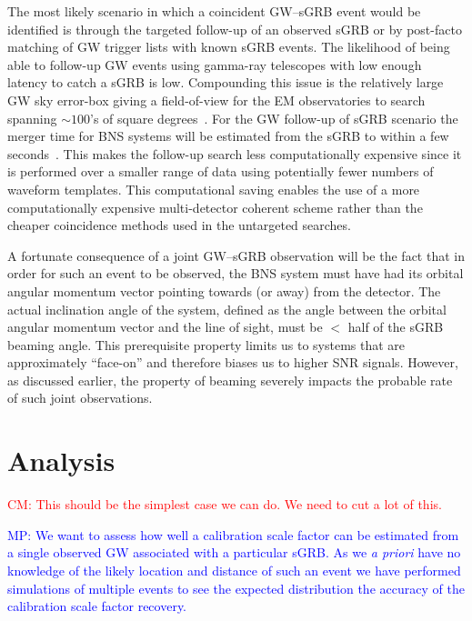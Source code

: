 \documentclass[10pt]{iopart}
\newcommand{\cm}[1]{\textcolor{red}{CM: #1}}
\newcommand{\MP}[1]{\textcolor{blue}{MP: #1}}
\begin{document}
The most likely scenario in which a coincident \ac{GW}--\ac{sGRB} event would
be identified is through the targeted follow-up of an observed \ac{sGRB} or by
post-facto matching of \ac{GW} trigger lists with known \ac{sGRB} events.  The
likelihood of being able to follow-up \ac{GW} events using gamma-ray telescopes
with low enough latency to catch a \ac{sGRB} is low.  Compounding this issue is
the relatively large \ac{GW} sky error-box giving a field-of-view for the
\ac{EM} observatories to search spanning $\sim 100$'s of square
degrees~\cite{grb}.  For the \ac{GW} follow-up of \ac{sGRB} scenario the merger
time for \ac{BNS} systems will be estimated from the \ac{sGRB} to within a few
seconds~\cite{grb}.  This makes the follow-up search less computationally
expensive since it is performed over a smaller range of data using potentially
fewer numbers of waveform templates.  This computational saving enables the use
of a more computationally expensive multi-detector coherent scheme rather than
the cheaper coincidence methods used in the untargeted searches. 

A fortunate consequence of a joint \ac{GW}--\ac{sGRB} observation will be the
fact that in order for such an event to be observed, the \ac{BNS} system must
have had its orbital angular momentum vector pointing towards (or away) from
the detector.  The actual inclination angle of the system, defined as the angle
between the orbital angular momentum vector and the line of sight, must be $<$
half of the \ac{sGRB} beaming angle.  This prerequisite property limits us to
systems that are approximately ``face-on'' and therefore biases us to higher
\ac{SNR} signals.  However, as discussed earlier, the property of beaming
severely impacts the probable rate of such joint observations.   


\section{Analysis}

\cm{This should be the simplest case we can do.  We need to cut a lot of this.}

\MP{We want to assess how well a calibration scale factor can be estimated
from a single observed \ac{GW} associated with a particular \ac{sGRB}. As we {\it a priori}
have no knowledge of the likely location and distance of such an event we have performed
simulations of multiple events to see the expected distribution the accuracy of the
calibration scale factor recovery.}
\end{document}
